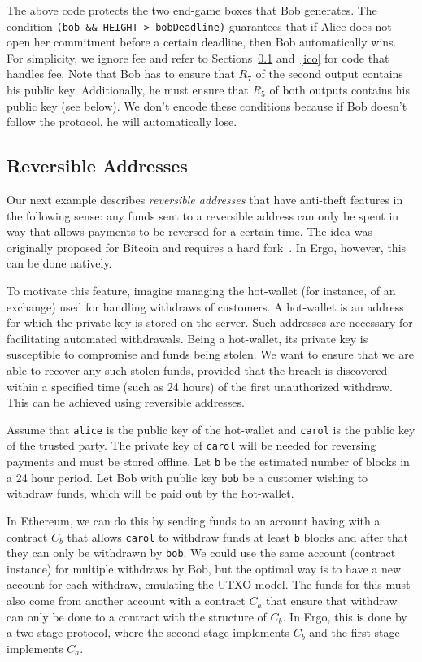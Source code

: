 \documentclass[runningheads]{llncs}
\begin{document}
The above code protects the two end-game boxes that Bob generates. The condition \texttt{(bob \&\& HEIGHT > bobDeadline)} guarantees that if Alice does not open her commitment before a certain deadline, then Bob automatically wins. For simplicity, we ignore fee and refer to Sections~\ref{reversible} and~\ref{ico} for code that handles fee. 
Note that Bob has to ensure that $R_7$ of the second output contains his public key. Additionally, he must ensure that $R_5$ of both outputs contains his public key (see below). We don't encode these conditions because if Bob doesn't follow the protocol, he will automatically lose.

\subsection{Reversible Addresses}
\label{reversible}

Our next example describes {\em reversible addresses} that have anti-theft features in the following sense: any funds sent to a reversible address can only be spent in way that allows payments to be reversed for a certain time. The idea was originally proposed for Bitcoin and requires a hard fork~\cite{raddress}. In Ergo, however, this can be done natively.

To motivate this feature, imagine managing the hot-wallet (for instance, of an exchange) used for handling withdraws of customers. A hot-wallet is an address for which the private key is stored on the server. Such addresses are necessary for facilitating automated withdrawals. Being a hot-wallet, its private key is susceptible to compromise and funds being stolen. 
We want to ensure that we are able to recover any such stolen funds, provided that the breach is discovered within a specified time (such as 24 hours) of the first unauthorized withdraw. This can be achieved using reversible addresses.

Assume that \texttt{alice} is the public key of the hot-wallet and \texttt{carol} is the public key of the trusted party. The private key of \texttt{carol} will be needed for reversing payments and must be stored offline. Let \texttt{b} be the estimated number of blocks in a 24 hour period. 
Let Bob with public key \texttt{bob} be a customer wishing to withdraw funds, which will be paid out by the hot-wallet. 

In Ethereum, we can do this by sending funds to an account having with a contract $C_{b}$ that allows \texttt{carol} to withdraw funds at least \texttt{b} blocks and after that they can only be withdrawn by \texttt{bob}. We could use the same account (contract instance) for multiple withdraws by Bob, but the optimal way is to have a new account for each withdraw, emulating the UTXO model. The funds for this must also come from another account with a contract $C_{a}$ that ensure that withdraw can only be done to a contract with the structure of $C_{b}$. 
In Ergo, this is done by a two-stage protocol, where the second stage implements $C_{b}$ and the first stage implements $C_{a}$. 
\end{document}
